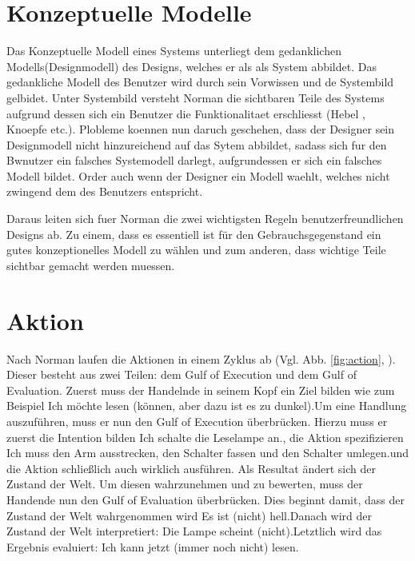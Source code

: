 \documentclass[parskip,headsepline, headtopline, %
footsepline, oneside, 12pt, headings=small]{scrreprt}
\begin{document}
\section{Konzeptuelle Modelle}

Das Konzeptuelle Modell eines Systems unterliegt dem gedanklichen Modells(Designmodell) des Designs, welches er als als System abbildet. Das gedankliche Modell des Benutzer wird durch sein Vorwissen und de Systembild gelbidet. Unter Systembild versteht Norman die sichtbaren Teile des Systems aufgrund dessen sich ein Benutzer die Funktionalitaet erschliesst (Hebel , Knoepfe etc.). Plobleme koennen nun daruch geschehen, dass der Designer sein Designmodell nicht hinzureichend auf das Sytem abbildet, sadass sich fur den Bwnutzer ein falsches Systemodell darlegt, aufgrundessen er sich ein falsches Modell bildet. Order auch wenn der Designer ein Modell waehlt, welches nicht zwingend dem des Benutzers entspricht.

Daraus leiten sich fuer Norman die  zwei wichtigsten Regeln benutzerfreundlichen Designs ab. Zu einem, dass es essentiell ist für den Gebrauchsgegenstand ein gutes konzeptionelles
Modell zu wählen und zum anderen, dass wichtige Teile sichtbar gemacht werden muessen.
\section{Aktion}

Nach Norman laufen die Aktionen in einem Zyklus ab (Vgl. Abb. \ref{fig:action}, \cite[S. 46ff]{don}). Dieser besteht aus zwei Teilen: dem Gulf of Execution und dem Gulf of Evaluation. Zuerst muss der Handelnde in seinem Kopf ein Ziel bilden wie zum Beispiel \glqq Ich möchte lesen (können, aber dazu ist es zu dunkel).\grqq Um eine Handlung auszuführen, muss er nun den Gulf of Execution überbrücken. Hierzu muss er zuerst die Intention bilden \glqq Ich schalte die Leselampe an.\grqq, die Aktion spezifizieren \glqq Ich muss den Arm ausstrecken, den Schalter fassen und den Schalter umlegen.\grqq und die Aktion schließlich auch wirklich ausführen. Als Resultat ändert sich der Zustand der Welt. Um diesen wahrzunehmen und zu bewerten, muss der Handende nun den Gulf of Evaluation überbrücken. Dies beginnt damit, dass der Zustand der Welt wahrgenommen wird \glqq Es ist (nicht) hell.\grqq Danach wird der Zustand der Welt interpretiert: \glqq Die Lampe scheint (nicht).\grqq Letztlich wird das Ergebnis evaluiert: \glqq Ich kann jetzt (immer noch nicht) lesen.\grqq
\end{document}
